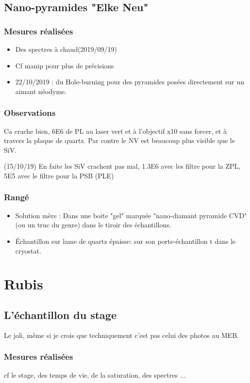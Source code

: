 \documentclass[a4paper]{report}
\begin{document}
 \subsection{Nano-pyramides "Elke Neu"}
  \subsubsection{Mesures réalisées}
  \begin{itemize}
  \item Des spectres à chaud(2019/09/19)
  \item Cf manip pour plus de précisions
  \item 22/10/2019 : du Hole-burning pour des pyramides posées directement sur un aimant néodyme.
  \end{itemize}
  
  
  \subsubsection{Observations}
  Ca crache bien, 6E6 de PL au laser vert et à l'objectif x10 sans forcer, et à travers la plaque de quartz. Par contre le NV est beaucoup plus visible que le SiV.
  
  (15/10/19) En faite les SiV crachent pas mal, 1.3E6 avec les filtre pour la ZPL, 5E5 avec le filtre pour la PSB (PLE)
  \subsubsection{Rangé}
  \begin{itemize}
  \item Solution mère : Dans une boite "gel" marquée "nano-diamant pyramide CVD" (ou un truc du genre) dans le tiroir des échantillons.
  \item Échantillon sur lame de quartz épaisse: sur son porte-échantillon t dans le cryostat.
  \end{itemize}
    
 \section{Rubis}
 \subsection{L'échantillon du stage}
 Le joli, même si je crois que techniquement c'est pas celui des photos au MEB.
 \subsubsection{Mesures réalisées}
 cf le stage, des temps de vie, de la saturation, des spectres ... 
\end{document}
